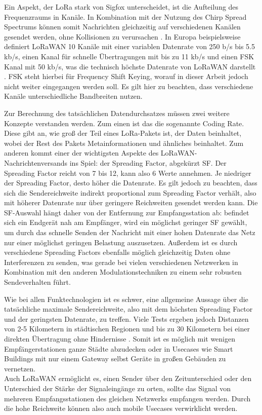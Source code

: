 Ein Aspekt, der LoRa stark von Sigfox unterscheidet, ist die Aufteilung des Frequenzraums in Kanäle. In Kombination mit der Nutzung des Chirp Spread Spectrums können somit Nachrichten gleichzeitig auf verschiedenen Kanälen gesendet werden, ohne Kollisionen zu verursachen . In Europa beispielsweise definiert LoRaWAN 10 Kanäle mit einer variablen Datenrate von 250 b/s bis 5.5 kb/s, einen Kanal für schnelle Übertragungen mit bis zu 11 kb/s und einen FSK Kanal mit 50 kb/s, was die technisch höchste Datenrate von LoRaWAN darstellt . FSK steht hierbei für Frequency Shift Keying, worauf in dieser Arbeit jedoch nicht weiter eingegangen werden soll. Es gilt hier zu beachten, dass verschiedene Kanäle unterschiedliche Bandbreiten nutzen.

Zur Berechnung des tatsächlichen Datendurchsatzes müssen zwei weitere Konzepte verstanden werden. Zum einen ist das die sogenannte Coding Rate. Diese gibt an, wie groß der Teil eines LoRa-Pakets ist, der Daten beinhaltet, wobei der Rest des Pakets Metainformationen und ähnliches beinhaltet. Zum anderen kommt einer der wichtigsten Aspekte des LoRaWAN-Nachrichtenversands ins Spiel: der Spreading Factor, abgekürzt SF. Der Spreading Factor reicht von 7 bis 12, kann also 6 Werte annehmen. Je niedriger der Spreading Factor, desto höher die Datenrate. Es gilt jedoch zu beachten, dass sich die Sendereichweite indirekt proportional zum Spreading Factor verhält, also mit höherer Datenrate nur über geringere Reichweiten gesendet werden kann. Die SF-Auswahl hängt daher von der Entfernung zur Empfangsstation ab: befindet sich ein Endgerät nah am Empfänger, wird ein möglichst geringer SF gewählt, um durch das schnelle Senden der Nachricht mit einer hohen Datenrate das Netz nur einer möglichst geringen Belastung auszusetzen. Außerdem ist es durch verschiedene Spreading Factors ebenfalls möglich gleichzeitig Daten ohne Interferenzen zu senden, was gerade bei vielen verschiedenen Netzwerken in Kombination mit den anderen Modulationstechniken zu einem sehr robusten Sendeverhalten führt. 

Wie bei allen Funktechnologien ist es schwer, eine allgemeine Aussage über die tatsächliche maximale Sendereichweite, also mit dem höchsten Spreading Factor und der geringsten Datenrate, zu treffen. Viele Tests ergeben jedoch Distanzen von 2-5 Kilometern in städtischen Regionen und bis zu 30 Kilometern bei einer direkten Übertragung ohne Hindernisse . Somit ist es möglich mit wenigen Empfängerstationen ganze Städte abzudecken oder in Usecases wie Smart Buildings mit nur einem Gateway selbst Geräte in großen Gebäuden zu vernetzen.\\
Auch LoRaWAN ermöglicht es, einen Sender über den Zeitunterschied oder den Unterschied der Stärke der Signaleingänge zu orten, sollte das Signal von mehreren Empfangs\-stationen des gleichen Netzwerks empfangen werden. Durch die hohe Reichweite können also auch mobile Usecases verwirklicht werden.

